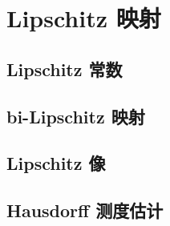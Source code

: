 \section{Lipschitz 映射}
\label{b1:sec:1601}


\subsection{Lipschitz 常数}
\label{b1:subsec:160101}

\subsection{bi-Lipschitz 映射}
\label{b1:subsec:160102}

\subsection{Lipschitz 像}
\label{b1:subsec:160103}

\subsection{Hausdorff 测度估计}
\label{b1:subsec:160104}


